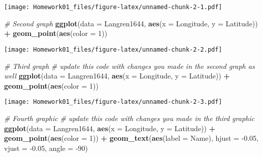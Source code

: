 \documentclass[]{article}
\newenvironment{Shaded}{\begin{snugshade}}{\end{snugshade}}
\newcommand{\CommentTok}[1]{\textcolor[rgb]{0.56,0.35,0.01}{\textit{#1}}}
\newcommand{\DataTypeTok}[1]{\textcolor[rgb]{0.13,0.29,0.53}{#1}}
\newcommand{\DecValTok}[1]{\textcolor[rgb]{0.00,0.00,0.81}{#1}}
\newcommand{\FloatTok}[1]{\textcolor[rgb]{0.00,0.00,0.81}{#1}}
\newcommand{\KeywordTok}[1]{\textcolor[rgb]{0.13,0.29,0.53}{\textbf{#1}}}
\newcommand{\NormalTok}[1]{#1}
\newcommand{\OperatorTok}[1]{\textcolor[rgb]{0.81,0.36,0.00}{\textbf{#1}}}
\newcommand{\StringTok}[1]{\textcolor[rgb]{0.31,0.60,0.02}{#1}}
\begin{document}
\texttt{[image: Homework01\_files/figure-latex/unnamed-chunk-2-1.pdf]}

\begin{Shaded}
\begin{Highlighting}[]
\CommentTok{# Second graph}
\KeywordTok{ggplot}\NormalTok{(}\DataTypeTok{data =}\NormalTok{ Langren1644, }\KeywordTok{aes}\NormalTok{(}\DataTypeTok{x =}\NormalTok{ Longitude, }\DataTypeTok{y =}\NormalTok{ Latitude)) }\OperatorTok{+}\StringTok{ }
\StringTok{  }\KeywordTok{geom_point}\NormalTok{(}\KeywordTok{aes}\NormalTok{(}\DataTypeTok{color =} \DecValTok{1}\NormalTok{))}
\end{Highlighting}
\end{Shaded}

\texttt{[image: Homework01\_files/figure-latex/unnamed-chunk-2-2.pdf]}

\begin{Shaded}
\begin{Highlighting}[]
\CommentTok{# Third graph}
\CommentTok{# update this code with changes you made in the second graph as well}
\KeywordTok{ggplot}\NormalTok{(}\DataTypeTok{data =}\NormalTok{ Langren1644, }\KeywordTok{aes}\NormalTok{(}\DataTypeTok{x =}\NormalTok{ Longitude, }\DataTypeTok{y =}\NormalTok{ Latitude)) }\OperatorTok{+}\StringTok{ }
\StringTok{  }\KeywordTok{geom_point}\NormalTok{(}\KeywordTok{aes}\NormalTok{(}\DataTypeTok{color =} \DecValTok{1}\NormalTok{))}
\end{Highlighting}
\end{Shaded}

\texttt{[image: Homework01\_files/figure-latex/unnamed-chunk-2-3.pdf]}

\begin{Shaded}
\begin{Highlighting}[]
\CommentTok{# Fourth graphic}
\CommentTok{# update this code with changes you made in the third graphic}
\KeywordTok{ggplot}\NormalTok{(}\DataTypeTok{data =}\NormalTok{ Langren1644, }\KeywordTok{aes}\NormalTok{(}\DataTypeTok{x =}\NormalTok{ Longitude, }\DataTypeTok{y =}\NormalTok{ Latitude)) }\OperatorTok{+}\StringTok{ }
\StringTok{  }\KeywordTok{geom_point}\NormalTok{(}\KeywordTok{aes}\NormalTok{(}\DataTypeTok{color =} \DecValTok{1}\NormalTok{)) }\OperatorTok{+}\StringTok{ }
\StringTok{  }\KeywordTok{geom_text}\NormalTok{(}\KeywordTok{aes}\NormalTok{(}\DataTypeTok{label =}\NormalTok{ Name), }\DataTypeTok{hjust =} \FloatTok{-0.05}\NormalTok{, }
    \DataTypeTok{vjust =} \FloatTok{-0.05}\NormalTok{, }\DataTypeTok{angle =} \DecValTok{-90}\NormalTok{)}
\end{Highlighting}
\end{Shaded}
\end{document}
